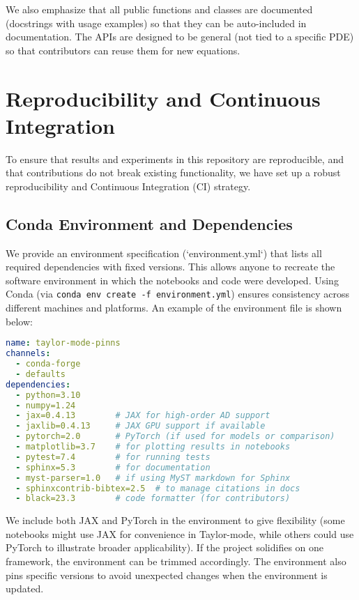 \documentclass[11pt]{article}
\begin{document}
We also emphasize that all public functions and classes are documented (docstrings with usage examples) so that they can be auto-included in documentation. The APIs are designed to be general (not tied to a specific PDE) so that contributors can reuse them for new equations.

\section{Reproducibility and Continuous Integration}
\label{sec:ci}

To ensure that results and experiments in this repository are reproducible, and that contributions do not break existing functionality, we have set up a robust reproducibility and Continuous Integration (CI) strategy.

\subsection{Conda Environment and Dependencies}

We provide an environment specification (`environment.yml`) that lists all required dependencies with fixed versions. This allows anyone to recreate the software environment in which the notebooks and code were developed. Using Conda (via \texttt{conda env create -f environment.yml}) ensures consistency across different machines and platforms. An example of the environment file is shown below:

\begin{lstlisting}[language=Yaml, caption=environment.yml (conda environment)]
name: taylor-mode-pinns
channels:
  - conda-forge
  - defaults
dependencies:
  - python=3.10
  - numpy=1.24
  - jax=0.4.13        # JAX for high-order AD support
  - jaxlib=0.4.13     # JAX GPU support if available
  - pytorch=2.0       # PyTorch (if used for models or comparison)
  - matplotlib=3.7    # for plotting results in notebooks
  - pytest=7.4        # for running tests
  - sphinx=5.3        # for documentation
  - myst-parser=1.0   # if using MyST markdown for Sphinx
  - sphinxcontrib-bibtex=2.5  # to manage citations in docs
  - black=23.3        # code formatter (for contributors)
\end{lstlisting}

We include both JAX and PyTorch in the environment to give flexibility (some notebooks might use JAX for convenience in Taylor-mode, while others could use PyTorch to illustrate broader applicability). If the project solidifies on one framework, the environment can be trimmed accordingly. The environment also pins specific versions to avoid unexpected changes when the environment is updated. 
\end{document}
